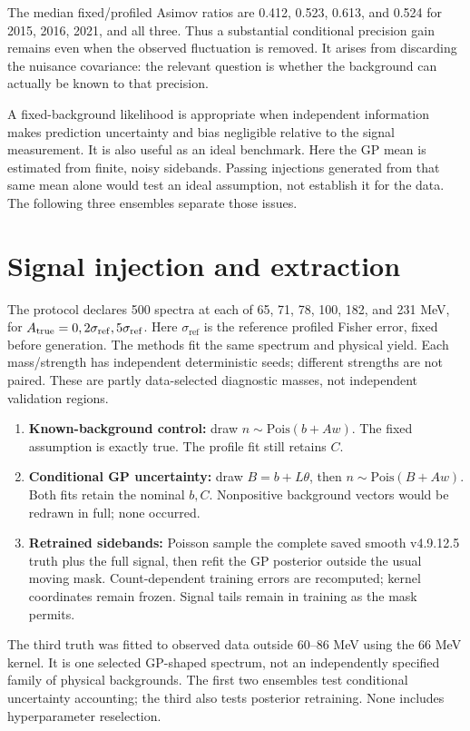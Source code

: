 \documentclass[11pt]{article}
\newcommand{\sigref}{\ensuremath{\sigma_{\mathrm{ref}}}}
\begin{document}
The median fixed/profiled Asimov ratios are 0.412, 0.523, 0.613, and 0.524
for 2015, 2016, 2021, and all three. Thus a substantial conditional precision
gain remains even when the observed fluctuation is removed. It arises from
discarding the nuisance covariance: the relevant question is whether the
background can actually be known to that precision.

A fixed-background likelihood is appropriate when independent information
makes prediction uncertainty and bias negligible relative to the signal
measurement. It is also useful as an ideal benchmark. Here the GP mean is
estimated from finite, noisy sidebands. Passing injections generated from that
same mean alone would test an ideal assumption, not establish it for the data.
The following three ensembles separate those issues.

\clearpage
\section{Signal injection and extraction}
\label{sec:toys}

The protocol declares 500 spectra at each of 65, 71, 78, 100, 182, and 231 MeV,
for $A_{\rm true}=0,2\sigref,5\sigref$. Here $\sigref$ is the reference
profiled Fisher error, fixed before generation. The methods fit the same
spectrum and physical yield. Each mass/strength has independent deterministic
seeds; different strengths are not paired. These are partly data-selected
diagnostic masses, not independent validation regions.

\begin{enumerate}
\item \textbf{Known-background control:} draw $n\sim\mathrm{Pois}(b+Aw)$.
The fixed assumption is exactly true. The profile fit still retains $C$.
\item \textbf{Conditional GP uncertainty:} draw $B=b+L\theta$, then
$n\sim\mathrm{Pois}(B+Aw)$. Both fits retain the nominal $b,C$.
Nonpositive background vectors would be redrawn in full; none occurred.
\item \textbf{Retrained sidebands:} Poisson sample the complete saved smooth
v4.9.12.5 truth plus the full signal, then refit the GP posterior outside the
usual moving mask. Count-dependent training errors are recomputed; kernel
coordinates remain frozen. Signal tails remain in training as the mask permits.
\end{enumerate}

The third truth was fitted to observed data outside 60--86 MeV using the
66 MeV kernel. It is one selected GP-shaped spectrum, not an independently
specified family of physical backgrounds. The first two ensembles test
conditional uncertainty accounting; the third also tests posterior retraining.
None includes hyperparameter reselection.
\end{document}
